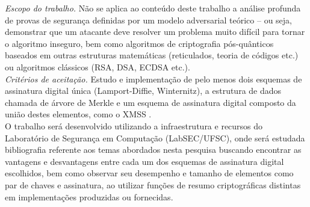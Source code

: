 \documentclass{article}
\begin{document}
\noindent \emph{Escopo do trabalho.} Não se aplica ao conteúdo deste trabalho
a análise profunda de provas de segurança definidas por um modelo adversarial
teórico -- ou seja, demonstrar que um atacante deve resolver um problema muito
difícil para tornar o algoritmo inseguro, bem como algoritmos de criptografia
pós-quânticos baseados em outras estruturas matemáticas (reticulados, teoria
de códigos etc.) ou algoritmos clássicos (RSA, DSA, ECDSA etc.). \\

\noindent \emph{Critérios de aceitação.} Estudo e implementação de pelo menos
dois esquemas de assinatura digital única (Lamport-Diffie, Winternitz),
a estrutura de dados chamada de árvore de Merkle e um esquema de assinatura
digital composto da união destes elementos, como o XMSS \cite{Buchmann2011}. \\

O trabalho será desenvolvido utilizando a infraestrutura e recursos do
Laboratório de Segurança em Computação (LabSEC/UFSC), onde será estudada
bibliografia referente aos temas abordados nesta pesquisa buscando encontrar
as vantagens e desvantagens entre cada um dos esquemas de assinatura digital
escolhidos, bem como observar seu desempenho e tamanho de elementos como
par de chaves e assinatura, ao utilizar funções de resumo criptográficas
distintas em implementações produzidas ou fornecidas.



\end{document}

